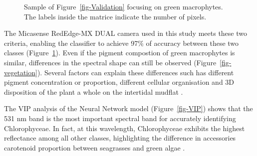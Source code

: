 \documentclass[
  number]{elsarticle}
\begin{document}
\label{cell-fig-ValidationGreen}
\begin{figure}[H]


\caption{\label{fig-ValidationGreen}Sample of
Figure~\ref{fig-Validation} focusing on green macrophytes. The labels
inside the matrice indicate the number of pixels.}

\end{figure}%

The Micasense RedEdge-MX DUAL camera used in this study meets these two
criteria, enabling the classifier to achieve 97\% of accuracy between
these two classes (Figure~\ref{fig-ValidationGreen}). Even if the
pigment compostion of green macrophytes is similar, differences in the
spectral shape can still be observed (Figure~\ref{fig-vegetation}).
Several factors can explain these differences such has different pigment
concentration or proportion, different cellular organisation and 3D
disposition of the plant a whole on the intertidal mudflat
\citep[\citep{kirk1994light},
\citep{hedley2018influence}]{beach1997vivo}.

The VIP analysis of the Neural Network model (Figure~\ref{fig-VIP})
shows that the 531 nm band is the most important spectral band for
accurately identifying Chlorophyceae. In fact, at this wavelength,
Chlorophyceae exhibits the highest reflectance among all other classes,
highlighting the difference in accessories carotenoid proportion between
seagrasses and green algae \citep{repolho2017seagrass}.
\end{document}
